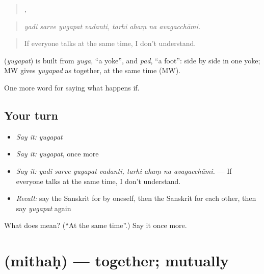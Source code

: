 \begin{quote}
   ,    
\end{quote}

\begin{quote}
\emph{yadi sarve yugapat vadanti, tarhi ahaṃ na avagacchāmi.}
\end{quote}

\begin{quote}
If everyone talks at the same time, I don't understand.
\end{quote}

\begin{cousinweb}
\textbf{} (\emph{yugapat}) is built from \emph{yuga}, \textquotedblleft{}a yoke\textquotedblright{}, and \emph{pad}, \textquotedblleft{}a foot\textquotedblright{}: side by side in one yoke; MW gives \emph{yugapad} as together, at the same time (MW).
\end{cousinweb}

\begin{grammarlens}[title={What you've built}]
One more word for saying what happens if.
\end{grammarlens}

\subsection*{Your turn}
\begin{itemize}
\raggedright
  \item \emph{Say it:} \emph{yugapat}
  \item \emph{Say it:} \emph{yugapat}, once more
  \item \emph{Say it:} \emph{yadi sarve yugapat vadanti, tarhi ahaṃ na avagacchāmi.} — If everyone talks at the same time, I don't understand.
  \item \emph{Recall:} say the Sanskrit for by oneself, then the Sanskrit for each other, then say \emph{yugapat} again
\end{itemize}

\begin{tcolorbox}[breakable,colback=teal!4,colframe=teal!35!black,title={Before you move on}]
What does  mean? (\textquotedblleft{}At the same time\textquotedblright{}.) Say it once more.
\end{tcolorbox}
\section[\texorpdfstring{\sk{मिथः} (mithaḥ)}{मिथः (mithaḥ)}]{ (mithaḥ) — together; mutually}

